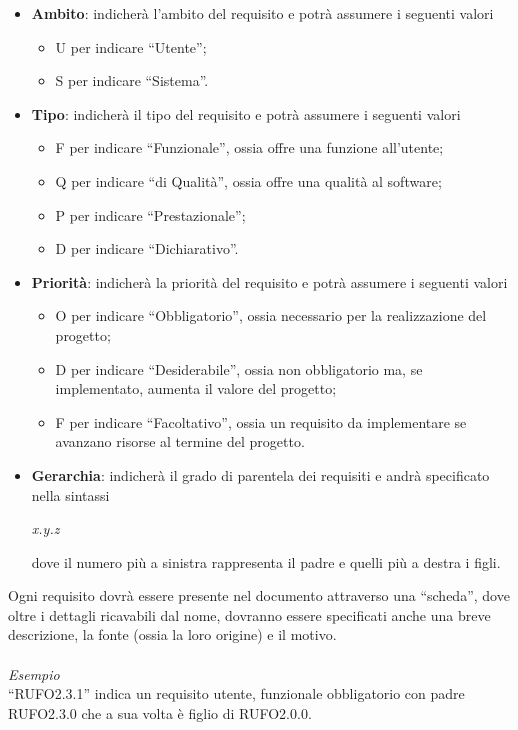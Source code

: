\begin{itemize}
\item \textbf{Ambito}: indicherà l'ambito del requisito e potrà assumere i seguenti valori
\begin{itemize}
\item U per indicare ``Utente'';
\item S per indicare ``Sistema''.
\end{itemize}
\item \textbf{Tipo}: indicherà il tipo del requisito e potrà assumere i seguenti valori
\begin{itemize}
\item F per indicare ``Funzionale'', ossia offre una funzione all'utente;
\item Q per indicare ``di Qualità'', ossia offre una qualità al software;
\item P per indicare ``Prestazionale'';
\item D per indicare ``Dichiarativo''.
\end{itemize}
\item \textbf{Priorità}: indicherà la priorità del requisito e potrà assumere i seguenti valori
\begin{itemize}
\item O per indicare ``Obbligatorio'', ossia necessario per la realizzazione del progetto;
\item D per indicare ``Desiderabile'', ossia non obbligatorio ma, se implementato, aumenta il valore del progetto;
\item F per indicare ``Facoltativo'', ossia un requisito da implementare se avanzano risorse al termine del progetto.
\end{itemize}
\item \textbf{Gerarchia}: indicherà il grado di parentela dei requisiti e andrà specificato nella sintassi
\begin{center}
\textit{x.y.z}
\end{center}
dove il numero più a sinistra rappresenta il padre e quelli più a destra i figli.
\end{itemize}
Ogni requisito dovrà essere presente nel documento attraverso una ``scheda'', dove oltre i dettagli ricavabili dal nome, dovranno essere specificati anche una breve descrizione, la fonte (ossia la loro origine) e il motivo.\\\\
\textit{Esempio}\\
``RUFO2.3.1'' indica un requisito utente, funzionale obbligatorio con padre RUFO2.3.0 che a sua volta è figlio di RUFO2.0.0.

